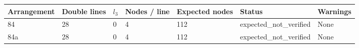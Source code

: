 \begin{tabular}{@{}p{1.5cm}p{1.8cm}p{1.7cm}p{1.7cm}p{2.2cm}p{2.0cm}p{5.0cm}@{}}
\toprule
Arrangement & Double lines & $l_3$ & Nodes / line & Expected nodes & Status & Warnings \\
\midrule
84 & 28 & 0 & 4 & 112 & expected_not_verified & None \\
84a & 28 & 0 & 4 & 112 & expected_not_verified & None \\
\bottomrule
\end{tabular}
